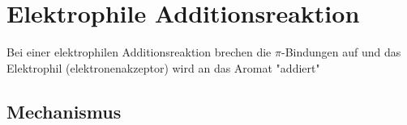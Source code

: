 \section{Elektrophile Additionsreaktion}
Bei einer elektrophilen Additionsreaktion brechen die $\pi$-Bindungen auf und das Elektrophil (elektronenakzeptor) wird an das Aromat "addiert"

\subsection{Mechanismus}

